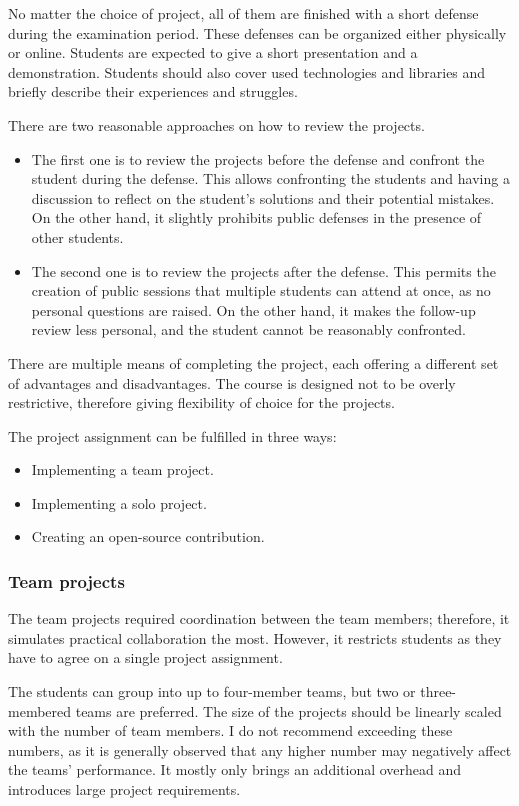 \documentclass[
  digital,
  color,
  oneside,
  nosansbold,
  nocolorbold,
  nolof,
  nolot,
]{fithesis4}
\begin{document}
No matter the choice of project, all of them are finished with a short defense during the examination period. These defenses can be organized either physically or online. Students are expected to give a short presentation and a demonstration. Students should also cover used technologies and libraries and briefly describe their experiences and struggles.

There are two reasonable approaches on how to review the projects.
\begin{itemize}
    \item The first one is to review the projects before the defense and confront the student during the defense. This allows confronting the students and having a discussion to reflect on the student's solutions and their potential mistakes. On the other hand, it slightly prohibits public defenses in the presence of other students.
    \item The second one is to review the projects after the defense. This permits the creation of public sessions that multiple students can attend at once, as no personal questions are raised. On the other hand, it makes the follow-up review less personal, and the student cannot be reasonably confronted.
\end{itemize}

There are multiple means of completing the project, each offering a different set of advantages and disadvantages. The course is designed not to be overly restrictive, therefore giving flexibility of choice for the projects.

The project assignment can be fulfilled in three ways:
\begin{itemize}
 \item Implementing a team project.
 \item Implementing a solo project.
 \item Creating an open-source contribution.
\end{itemize}

\subsubsection{Team projects}

The team projects required coordination between the team members; therefore, it simulates practical collaboration the most. However, it restricts students as they have to agree on a single project assignment. 

The students can group into up to four-member teams, but two or three-membered teams are preferred. The size of the projects should be linearly scaled with the number of team members. I do not recommend exceeding these numbers, as it is generally observed that any higher number may negatively affect the teams' performance. It mostly only brings an additional overhead and introduces large project requirements.
\end{document}
